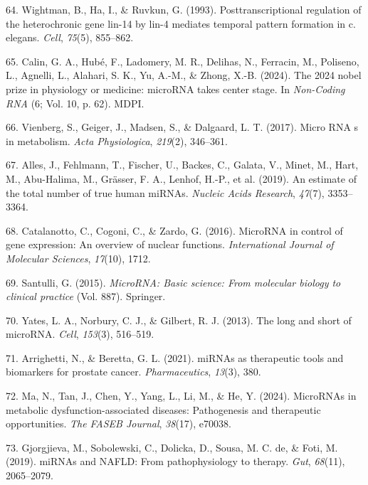 \documentclass[
  11pt,
  letterpaper,
]{book}
\newlength{\cslhangindent}
\newenvironment{CSLReferences}[2] %
 {\begin{list}{}{%
  \setlength{\itemindent}{0pt}
  \setlength{\leftmargin}{0pt}
  \setlength{\parsep}{0pt}
  \ifodd #1
   \setlength{\leftmargin}{\cslhangindent}
   \setlength{\itemindent}{-1\cslhangindent}
  \fi
  \setlength{\itemsep}{#2\baselineskip}}}
 {\end{list}}
\begin{document}
\begin{CSLReferences}{1}{0}
64. Wightman, B., Ha, I., \& Ruvkun, G. (1993). Posttranscriptional
regulation of the heterochronic gene lin-14 by lin-4 mediates temporal
pattern formation in c. elegans. \emph{Cell}, \emph{75}(5), 855--862.

65. Calin, G. A., Hubé, F., Ladomery, M. R., Delihas, N., Ferracin, M.,
Poliseno, L., Agnelli, L., Alahari, S. K., Yu, A.-M., \& Zhong, X.-B.
(2024). The 2024 nobel prize in physiology or medicine: microRNA takes
center stage. In \emph{Non-Coding RNA} (6; Vol. 10, p. 62). MDPI.

66. Vienberg, S., Geiger, J., Madsen, S., \& Dalgaard, L. T. (2017).
Micro RNA s in metabolism. \emph{Acta Physiologica}, \emph{219}(2),
346--361.

67. Alles, J., Fehlmann, T., Fischer, U., Backes, C., Galata, V., Minet,
M., Hart, M., Abu-Halima, M., Grässer, F. A., Lenhof, H.-P., et al.
(2019). An estimate of the total number of true human miRNAs.
\emph{Nucleic Acids Research}, \emph{47}(7), 3353--3364.

68. Catalanotto, C., Cogoni, C., \& Zardo, G. (2016). MicroRNA in
control of gene expression: An overview of nuclear functions.
\emph{International Journal of Molecular Sciences}, \emph{17}(10), 1712.

69. Santulli, G. (2015). \emph{MicroRNA: Basic science: From molecular
biology to clinical practice} (Vol. 887). Springer.

70. Yates, L. A., Norbury, C. J., \& Gilbert, R. J. (2013). The long and
short of microRNA. \emph{Cell}, \emph{153}(3), 516--519.

71. Arrighetti, N., \& Beretta, G. L. (2021). miRNAs as therapeutic
tools and biomarkers for prostate cancer. \emph{Pharmaceutics},
\emph{13}(3), 380.

72. Ma, N., Tan, J., Chen, Y., Yang, L., Li, M., \& He, Y. (2024).
MicroRNAs in metabolic dysfunction-associated diseases: Pathogenesis and
therapeutic opportunities. \emph{The FASEB Journal}, \emph{38}(17),
e70038.

73. Gjorgjieva, M., Sobolewski, C., Dolicka, D., Sousa, M. C. de, \&
Foti, M. (2019). miRNAs and NAFLD: From pathophysiology to therapy.
\emph{Gut}, \emph{68}(11), 2065--2079.


\end{CSLReferences}
\end{document}
